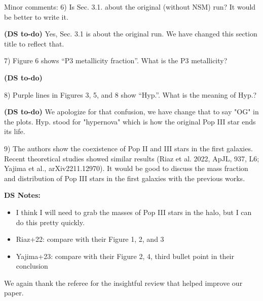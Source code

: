 \documentclass[11pt]{article}
\begin{document}
\begin{tcolorbox}[colback={lightgray}]
    Minor comments:
    6)      Is Sec. 3.1. about the original (without NSM) run? It would be better to write it.
\end{tcolorbox}

\textbf{(DS to-do)} Yes, Sec. 3.1 is about the original run. We have changed this section title to reflect that.

\begin{tcolorbox}[colback={lightgray}]
    7)      Figure 6 shows “P3 metallicity fraction”. What is the P3 metallicity?
\end{tcolorbox}

\textbf{(DS to-do)}

\begin{tcolorbox}[colback={lightgray}]
    8)      Purple lines in Figures 3, 5, and 8 show “Hyp.”. What is the meaning of Hyp.?
\end{tcolorbox}

\textbf{(DS to-do)} We apologize for that confusion, we have change that to say "OG" in the plots. Hyp. stood for "hypernova" which is how the original Pop III star ends its life.

\begin{tcolorbox}[colback={lightgray}]
    9)      The authors show the coexistence of Pop II and III stars in the first galaxies. Recent theoretical studies showed similar results (Riaz et al. 2022, ApJL, 937, L6; Yajima et al., arXiv2211.12970). It would be good to discuss the mass fraction and distribution of Pop III stars in the first galaxies with the previous works. 
\end{tcolorbox}

\textbf{DS Notes:}
\begin{itemize}
    \item I think I will need to grab the masses of Pop III stars in the halo, but I can do this pretty quickly.
    \item Riaz+22: compare with their Figure 1, 2, and 3
    \item Yajima+23: compare with their Figure 2, 4, third bullet point in their conclusion
\end{itemize}

We again thank the referee for the insightful review that helped
improve our paper.



\end{document}

